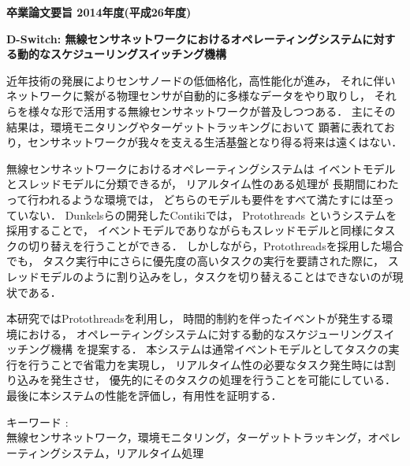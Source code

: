 \begin{center}
\textbf{\Large 卒業論文要旨 2014年度(平成26年度)}

\vspace{6.18mm}

\textbf{\Large D-Switch: 無線センサネットワークにおけるオペレーティングシステムに対する動的なスケジューリングスイッチング機構}
\end{center}

\vspace{10mm}
近年技術の発展によりセンサノードの低価格化，高性能化が進み，
それに伴いネットワークに繋がる物理センサが自動的に多様なデータをやり取りし，
それらを様々な形で活用する無線センサネットワークが普及しつつある．
主にその結果は，環境モニタリングやターゲットトラッキングにおいて
顕著に表れており，センサネットワークが我々を支える生活基盤となり得る将来は遠くはない．

無線センサネットワークにおけるオペレーティングシステムは
イベントモデルとスレッドモデルに分類できるが，
リアルタイム性のある処理が
長期間にわたって行われるような環境では，
どちらのモデルも要件をすべて満たすには至っていない．
Dunkelsらの開発したContiki\cite{Dunkels:2004:CLF:1032658.1034117}では，
Protothreads\cite{Dunkels:2006:PSE:1182807.1182811}
というシステムを採用することで，
イベントモデルでありながらもスレッドモデルと同様にタスクの切り替えを行うことができる．
しかしながら，Protothreadsを採用した場合でも，
タスク実行中にさらに優先度の高いタスクの実行を要請された際に，
スレッドモデルのように割り込みをし，タスクを切り替えることはできないのが現状である．

本研究ではProtothreadsを利用し，
時間的制約を伴ったイベントが発生する環境における，
オペレーティングシステムに対する動的なスケジューリングスイッチング機構
を提案する．
本システムは通常イベントモデルとしてタスクの実行を行うことで省電力を実現し，
リアルタイム性の必要なタスク発生時には割り込みを発生させ，
優先的にそのタスクの処理を行うことを可能にしている．
最後に本システムの性能を評価し，有用性を証明する．


\vspace{10mm}
キーワード :\\
\hspace{3.5em}無線センサネットワーク，環境モニタリング，ターゲットトラッキング，オペレーティングシステム，リアルタイム処理

